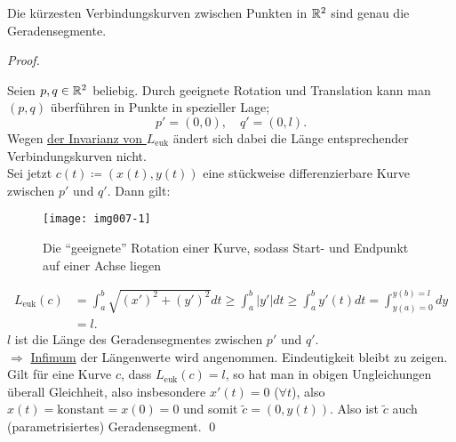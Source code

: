 \begin{lemma}
  \label{lemma:geradenkurz}
  Die kürzesten Verbindungskurven zwischen Punkten in $ \mathbb{R}^2 $ sind genau die Geradensegmente. \\
  \begin{proof}
    \ \\
    \begin{minipage}{.45\textwidth}
      Seien $ p, q \in \mathbb{R}^2 $ beliebig. Durch geeignete Rotation und Translation kann man $ (p,q) $ überführen in Punkte in spezieller Lage;
      \begin{equation*}
        p' = (0,0), \quad q' = (0,l)\text{.}
      \end{equation*}
      Wegen \hyperref[lm:leuklinvarianz]{der Invarianz von $ L_\text{euk} $} ändert sich dabei die Länge entsprechender Verbindungskurven nicht. \\
      Sei jetzt $ c(t) \coloneqq (x(t),y(t)) $ eine stückweise differenzierbare Kurve zwischen $ p' $ und $ q' $. Dann gilt:
    \end{minipage}
    \hfill
    \begin{minipage}{.45\textwidth}
      \begin{figure}[H]
        \label{img007-1}
        \texttt{[image: img007-1]}
        \caption{Die ``geeignete'' Rotation einer Kurve, sodass Start- und Endpunkt auf einer Achse liegen}
      \end{figure}
    \end{minipage}
    \begin{align*}
      L_\text{euk}(c) &= \int_a^b\sqrt{(x')^2+(y')^2}dt \geq \int_a^b\vert y' \vert dt \geq \int_a^by'(t)dt = \int_{y(a) = 0}^{y(b) = l} dy \\
       &= l\text{.}
    \end{align*}
    $ l $ ist die Länge des Geradensegmentes zwischen $ p' $ und $ q' $. \\
    $ \Rightarrow $ \underline{Infimum} der Längenwerte wird angenommen. Eindeutigkeit bleibt zu zeigen. \\
    Gilt für eine Kurve $ c $, dass $ L_\text{euk}(c) = l $, so hat man in obigen Ungleichungen überall Gleichheit, also insbesondere $ x'(t) = 0 $ ($ \forall t $), also $ x(t) = \text{konstant} = x(0) = 0 $ und somit $ \widetilde{c} = (0,y(t)) $. Also ist $ \widetilde{c} $ auch (parametrisiertes) Geradensegment. \qed
  \end{proof}
\end{lemma}

